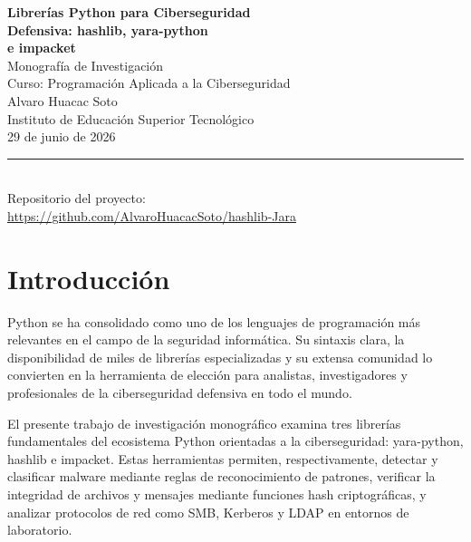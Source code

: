 \documentclass[12pt,a4paper]{article}
\title{}
\author{}
\date{}
\begin{document}
\begin{titlepage}
\thispagestyle{empty}
\begin{center}
\vspace*{4cm}

{\LARGE \textbf{Librerías Python para Ciberseguridad}}\\[8pt]
{\LARGE \textbf{Defensiva: hashlib, yara-python}}\\[8pt]
{\LARGE \textbf{e impacket}}\\[24pt]

{\large Monografía de Investigación}\\[12pt]
{\large Curso: Programación Aplicada a la Ciberseguridad}\\[36pt]

{\large Alvaro Huacac Soto}\\[8pt]
{\large Instituto de Educación Superior Tecnológico}\\[24pt]

{\large 29 de junio de 2026}

\vspace{2cm}
\rule{10cm}{0.5pt}\\[12pt]
{\footnotesize Repositorio del proyecto:\\
\url{https://github.com/AlvaroHuacacSoto/hashlib-Jara}}

\end{center}
\end{titlepage}

\section{Introducción}

Python se ha consolidado como uno de los lenguajes de programación más
relevantes en el campo de la seguridad informática. Su sintaxis clara,
la disponibilidad de miles de librerías especializadas y su extensa
comunidad lo convierten en la herramienta de elección para analistas,
investigadores y profesionales de la ciberseguridad defensiva en todo el
mundo.

El presente trabajo de investigación monográfico examina tres librerías
fundamentales del ecosistema Python orientadas a la ciberseguridad:
yara-python, hashlib e impacket. Estas herramientas permiten,
respectivamente, detectar y clasificar malware mediante reglas de
reconocimiento de patrones, verificar la integridad de archivos y
mensajes mediante funciones hash criptográficas, y analizar protocolos
de red como SMB, Kerberos y LDAP en entornos de laboratorio.
\end{document}

